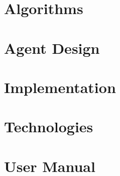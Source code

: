 \section{Algorithms} \label{section:approach-algorithms}

\section{Agent Design} \label{section:agent-design}

\section{Implementation} \label{section:implementation}

\section{Technologies} \label{section:technologies}

\section{User Manual} \label{section:user-manual}
